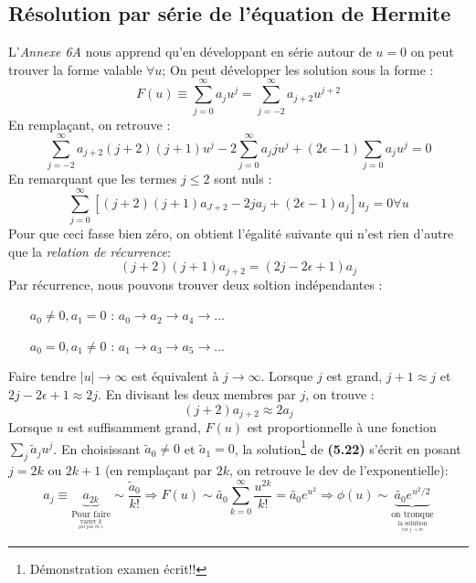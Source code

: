 \documentclass	[11pt, a4paper, openany]{book}
\begin{document}
\subsection{Résolution par série de l'équation de Hermite}
L'\textit{Annexe 6A} nous apprend qu'en développant en série autour de $u=0$ on peut trouver la forme valable $\forall  u$; On peut développer les solution sous la forme :
\begin{equation}
F(u) \equiv \sum_{j=0}^\infty a_ju^j = \sum_{j=-2}^\infty a_{j+2}u^{j+2}
\end{equation}
En remplaçant, on retrouve :
\begin{equation}
\sum_{j=-2}^\infty a_{j+2}(j+2)(j+1)u^j - 2\sum_{j=0}^\infty a_jju^j + (2\epsilon-1)\sum_{j=0} a_ju^j = 0
\end{equation}
En remarquant que les termes $j \leq 2$ sont nuls :
\begin{equation}
\sum_{j=0}^\infty\left[ (j+2)(j+1)a_{J+2} - 2ja_j + (2\epsilon - 1)a_j \right]u_j = 0 \forall u
\end{equation}
Pour que ceci fasse bien zéro, on obtient l'égalité suivante qui n'est rien d'autre que la \textit{relation de récurrence}:
\begin{equation}\label{eq:5.21}
(j+2)(j+1)a_{j+2} = (2j-2\epsilon+1)a_j
\end{equation}
Par récurrence, nous pouvons trouver deux soltion indépendantes :
\begin{itemize}
\item[$a_0 \neq 0, a_1 = 0$] : $a_0 \rightarrow a_2 \rightarrow a_4 \rightarrow ...$
\item[$a_0 = 0, a_1 \neq 0$] : $a_1 \rightarrow a_3 \rightarrow a_5 \rightarrow ...$
\end{itemize}
Faire tendre $|u| \rightarrow \infty$ est équivalent à $j \rightarrow \infty$. Lorsque $j$ est grand, $j+1 \approx j$ et $2j-2\epsilon + 1 \approx 2j$. En divisant les deux membres par $j$, on trouve :
\begin{equation}
(j+2)a_{j+2} \approx 2a_j
\end{equation}
Lorsque $u$ est suffisamment grand, $F(u)$ est proportionnelle à une fonction $\sum_j \tilde{a}_ju^j$. En choisissant $\tilde{a}_0 \neq 0$ et $\tilde{a}_1 = 0$, la solution\footnote{Démonstration examen écrit!!} de \textbf{(5.22)} s'écrit en posant $j = 2k$ ou $2k+1$ (en remplaçant par $2k$, on retrouve le dev de l'exponentielle):
\begin{equation}
a_j \equiv \underbrace{a_{2k}}_{\underset{\underset{\text{par pas de 1}}{\text{varier $k$}}}{\text{Pour faire}}} \sim \frac{\tilde{a}_0}{k!} \Rightarrow F(u) \sim  \tilde{a_0}\sum_{k=0}^\infty \frac{u^{2k}}{k!} = \tilde{a_0}e^{u^2} \Rightarrow \phi(u) \sim \underbrace{\tilde{a_0}e^{u^2/2}}_{\underset{\underset{\text{car $j\rightarrow\infty$}}{\text{la solution}}}{\text{on tronque}}}
\end{equation}
\end{document}
